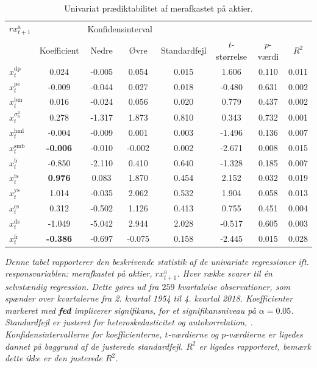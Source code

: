 \documentclass[
  a4paper,
  oneside]{memoir}
\begin{document}
\begin{table}[H]

\caption{\label{tab:UNI-ak}Univariat prædiktabilitet af merafkastet på aktier.}
\centering
\begin{threeparttable}
\begin{tabular}[t]{lccccccc}
\toprule
\multicolumn{1}{c}{$rx_{t+1}^{\text{a}}$} & \multicolumn{1}{c}{ } & \multicolumn{2}{c}{Konfidensinterval} & \multicolumn{4}{c}{ } \\
\cmidrule(l{3pt}r{3pt}){1-1} \cmidrule(l{3pt}r{3pt}){3-4}
  & Koefficient & Nedre & Øvre & Standardfejl & $t$-størrelse & $p$-værdi & $R^2$\\
\midrule
\rowcolor{gray!6}  $x_t^{\text{dp}}$ & 0.024 & -0.005 & 0.054 & 0.015 & 1.606 & 0.110 & 0.011\\
$x_t^{\text{pe}}$ & -0.009 & -0.044 & 0.027 & 0.018 & -0.480 & 0.631 & 0.002\\
\rowcolor{gray!6}  $x_t^{\text{bm}}$ & 0.016 & -0.024 & 0.056 & 0.020 & 0.779 & 0.437 & 0.002\\
$x_t^{\sigma_{\text{a}}^2}$ & 0.278 & -1.317 & 1.873 & 0.810 & 0.343 & 0.732 & 0.001\\
\rowcolor{gray!6}  $x_t^{\text{hml}}$ & -0.004 & -0.009 & 0.001 & 0.003 & -1.496 & 0.136 & 0.007\\
$x_t^{\text{smb}}$ & \textbf{-0.006} & -0.010 & -0.002 & 0.002 & -2.671 & 0.008 & 0.015\\
\rowcolor{gray!6}  $x_t^{\text{b}}$ & -0.850 & -2.110 & 0.410 & 0.640 & -1.328 & 0.185 & 0.007\\
$x_t^{\text{ts}}$ & \textbf{ 0.976} & 0.083 & 1.870 & 0.454 & 2.152 & 0.032 & 0.019\\
\rowcolor{gray!6}  $x_t^{\text{ys}}$ & 1.014 & -0.035 & 2.062 & 0.532 & 1.904 & 0.058 & 0.013\\
$x_t^{\text{cs}}$ & 0.312 & -0.502 & 1.126 & 0.413 & 0.755 & 0.451 & 0.004\\
\rowcolor{gray!6}  $x_t^{\text{ds}}$ & -1.049 & -5.042 & 2.944 & 2.028 & -0.517 & 0.605 & 0.003\\
$x_t^{\text{fr}}$ & \textbf{-0.386} & -0.697 & -0.075 & 0.158 & -2.445 & 0.015 & 0.028\\
\bottomrule
\end{tabular}
\begin{tablenotes}
\item \textit{Denne tabel rapporterer den beskrivende statistik af de univariate regressioner ift. responsvariablen: merafkastet på aktier, $rx_{t+1}^{\text{a}}$. Hver række svarer til én selvstændig regression. Dette gøres ud fra $259$ kvartalvise observationer, som spænder over kvartalerne fra 2. kvartal 1954 til 4. kvartal 2018. Koefficienter markeret med \textbf{fed} implicerer signifikans, for et signifikansniveau på $\alpha=0.05$. Standardfejl er justeret for heteroskedasticitet og autokorrelation, \citep{Newey1987}. Konfidensintervallerne for koefficienterne, $t$-værdierne og $p$-værdierne er ligedes dannet på baggrund af de justerede standardfejl. $R^2$ er ligedes rapporteret, bemærk dette ikke er den justerede $R^2$.}
\end{tablenotes}
\end{threeparttable}
\end{table}
\end{document}
